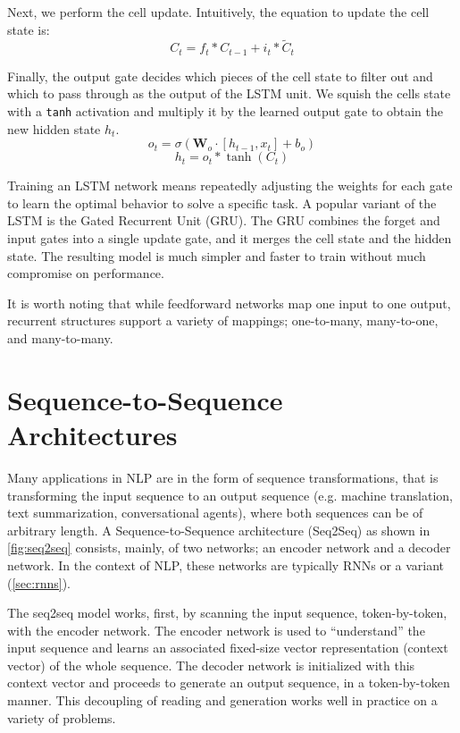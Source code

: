 Next, we perform the cell update. Intuitively, the equation to update the cell state is:
\[ C_t = f_t * C_{t-1} + i_t * \tilde{C}_t \]

Finally, the output gate decides which pieces of the cell state to filter out and which to pass through as the output of the LSTM unit. We squish the cells state with a \texttt{tanh} activation and multiply it by the learned output gate to obtain the new hidden state $h_t$.
\[ o_t = \sigma (\mathbf{W}_o \cdot [h_{t-1}, x_t] + b_o) \]
\[ h_t = o_t * \tanh (C_t) \]

Training an LSTM network means repeatedly adjusting the weights for each gate to learn the optimal behavior to solve a specific task. A popular variant of the LSTM is the Gated Recurrent Unit (GRU). The GRU combines the forget and input gates into a single update gate, and it merges the cell state and the hidden state. The resulting model is much simpler and faster to train without much compromise on  performance.

It is worth noting that while feedforward networks map one input to one output, recurrent structures support a variety of mappings; one-to-many, many-to-one, and many-to-many.



\section{Sequence-to-Sequence Architectures}
\label{sec:seq2seq}

Many applications in NLP are in the form of sequence transformations, that is transforming the input sequence to an output sequence (e.g. machine translation, text summarization, conversational agents), where both sequences can be of arbitrary length. A Sequence-to-Sequence architecture (Seq2Seq) as shown in \cref{fig:seq2seq} consists, mainly, of two networks; an encoder network and a decoder network. In the context of NLP, these networks are typically RNNs or a variant (\cref{sec:rnns}).

The seq2seq model works, first, by scanning the input sequence, token-by-token, with the encoder network. The encoder network is used to ``understand'' the input sequence and learns an associated fixed-size vector representation (context vector) of the whole sequence. The decoder network is initialized with this context vector and proceeds to generate an output sequence, in a token-by-token manner. This decoupling of reading and generation works well in practice on a variety of problems.

